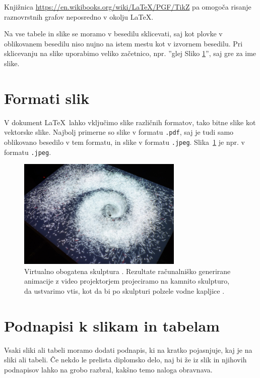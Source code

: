 \documentclass[a4paper,12pt,openright]{book}
\begin{document}
Knjižnica \url{https://en.wikibooks.org/wiki/LaTeX/PGF/TikZ} 
pa omo\-go\-ča risanje raznovrstnih grafov neposredno v okolju \LaTeX .

Na vse tabele in slike se moramo v besedilu sklicevati, saj kot plovke v oblikovanem besedilu niso nujno na istem mestu kot v izvornem besedilu.
Pri sklicevanju na slike uporabimo veliko začetnico, npr. ''glej Sliko \ref{pic1}'', saj gre za ime slike.



\section{Formati slik}

V  dokument \LaTeX\ lahko vključimo slike različnih formatov, tako
bitne slike kot vektorske slike. Najbolj primerne so slike v formatu {\tt .pdf}, saj je tudi samo
oblikovano besedilo v tem formatu, in slike v formatu {\tt .jpeg}.
Slika~\ref{pic1} je npr. v formatu {\tt .jpeg}.

\begin{figure}[htb]
\begin{center}
\includegraphics[width=0.7\textwidth]{galaksija}
\end{center}
\caption{Virtualno obogatena skulptura \cite{vodnjak}. Rezultate računalniško generirane animacije z video projektorjem projeciramo na kamnito skulpturo, da ustvarimo vtis, kot da bi po skulpturi polzele vodne kapljice \cite{video,solina2020skulpture}.}
\label{pic1}
\end{figure}



\section{Podnapisi k slikam in tabelam}

Vsaki sliki ali tabeli moramo dodati podnapis, ki na kratko pojasnjuje, kaj je na sliki ali tabeli. 
Če nekdo le prelista diplomsko delo, naj bi že iz slik in njihovih podnapisov lahko na grobo razbral, kakšno temo naloga obravnava.
\end{document}
